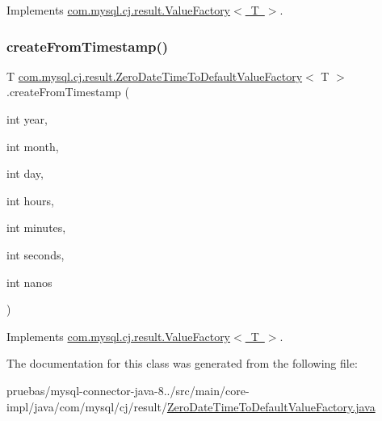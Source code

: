 Implements \mbox{\hyperlink{interfacecom_1_1mysql_1_1cj_1_1result_1_1_value_factory_a5edf0bed225d34bd1fade72d8f106760}{com.\+mysql.\+cj.\+result.\+Value\+Factory$<$ T $>$}}.

\mbox{\label{classcom_1_1mysql_1_1cj_1_1result_1_1_zero_date_time_to_default_value_factory_a5b0935e9804d9f90a3fd09ce5bb78fc8}} 
\subsubsection{\texorpdfstring{create\+From\+Timestamp()}{createFromTimestamp()}}
{\footnotesize\ttfamily T \mbox{\hyperlink{classcom_1_1mysql_1_1cj_1_1result_1_1_zero_date_time_to_default_value_factory}{com.\+mysql.\+cj.\+result.\+Zero\+Date\+Time\+To\+Default\+Value\+Factory}}$<$ T $>$.create\+From\+Timestamp (\begin{DoxyParamCaption}\item[{int}]{year,  }\item[{int}]{month,  }\item[{int}]{day,  }\item[{int}]{hours,  }\item[{int}]{minutes,  }\item[{int}]{seconds,  }\item[{int}]{nanos }\end{DoxyParamCaption})}



Implements \mbox{\hyperlink{interfacecom_1_1mysql_1_1cj_1_1result_1_1_value_factory_accbdc6c6970a22e40a0b1d72213334e6}{com.\+mysql.\+cj.\+result.\+Value\+Factory$<$ T $>$}}.



The documentation for this class was generated from the following file\+:\begin{DoxyCompactItemize}
\item 
pruebas/mysql-\/connector-\/java-\/8../src/main/core-\/impl/java/com/mysql/cj/result/\mbox{\hyperlink{_zero_date_time_to_default_value_factory_8java}{Zero\+Date\+Time\+To\+Default\+Value\+Factory.\+java}}\end{DoxyCompactItemize}
